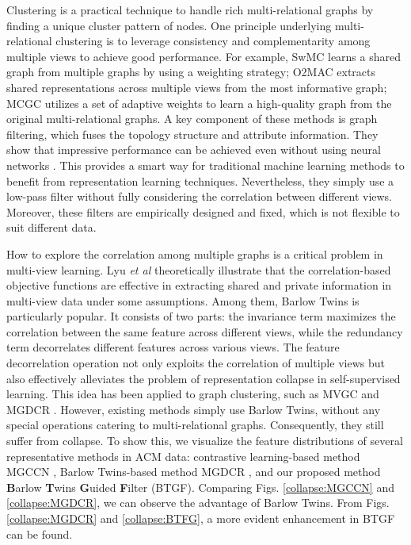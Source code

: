 \documentclass[letterpaper]{article} %
\begin{document}
Clustering is a practical technique to handle rich multi-relational graphs by finding a unique cluster pattern of nodes. One principle underlying multi-relational clustering is to leverage consistency and complementarity among multiple views to achieve good performance. For example, SwMC \cite{nie2017self} learns a shared graph from multiple graphs by using a weighting strategy; O2MAC \cite{fan2020one2multi} extracts shared representations across multiple views from the most informative graph; MCGC \cite{pan2021multi} utilizes a set of adaptive weights to learn a high-quality graph from the original multi-relational graphs. A key component of these methods is graph filtering, which fuses the topology structure and attribute information. They show that impressive performance can be achieved even without using neural networks \cite{lin2023multi, pan2023high}. This provides a smart way for traditional machine learning methods to benefit from representation learning techniques. Nevertheless, they simply use a low-pass filter without fully considering the correlation between different views. Moreover, these filters are empirically designed and fixed, which is not flexible to suit different data.

How to explore the correlation among multiple graphs is a critical problem in multi-view learning. Lyu \textit{et al} \cite{lyu2022understanding} theoretically illustrate that the correlation-based objective functions are effective in extracting shared and private information in multi-view data under some assumptions. Among them, Barlow Twins \cite{zbontar2021barlow} is particularly popular. It consists of two parts: the invariance term maximizes the correlation between the same feature across different views, while the redundancy term decorrelates different features across various views. The feature decorrelation operation not only exploits the correlation of multiple views but also effectively alleviates the problem of representation collapse in self-supervised learning. This idea has been applied to graph clustering, such as MVGC \cite{xia2022multi} and MGDCR \cite{mo2023multiplex}. However, existing methods simply use Barlow Twins, without any special operations catering to multi-relational graphs. Consequently, they still suffer from collapse. To show this, we visualize the feature distributions of several representative methods in ACM data: contrastive learning-based method MGCCN \cite{liu2022deep}, Barlow Twins-based method MGDCR \cite{mo2023multiplex}, and our proposed method \textbf{B}arlow \textbf{T}wins \textbf{G}uided \textbf{F}ilter (BTGF). Comparing Figs. \ref{collapse:MGCCN} and \ref{collapse:MGDCR}, we can observe the advantage of Barlow Twins. From Figs. \ref{collapse:MGDCR} and \ref{collapse:BTFG}, a more evident enhancement in BTGF can be found.
\end{document}
